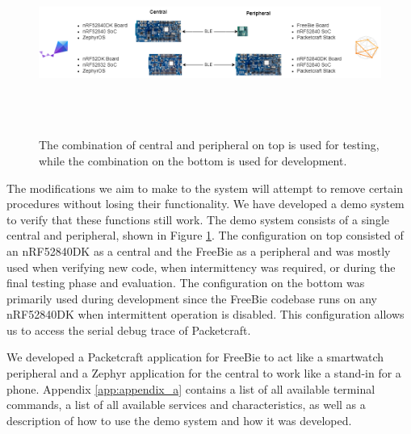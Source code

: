 \begin{figure}
    \centering
    \includegraphics[width=1\textwidth,height=6cm,keepaspectratio=true]{images/demo_layout/demo_layout.drawio.png}
    \caption{
        The combination of central and peripheral on top is used for testing, while the combination on the bottom is used for development.
    }
    \label{fig:demo_layout}
\end{figure}
The modifications we aim to make to the system will attempt to remove certain procedures without losing their functionality. We have developed a demo system to verify that these functions still work. The demo system consists of a single central and peripheral, shown in Figure \ref{fig:demo_layout}. The configuration on top consisted of an nRF52840DK as a central and the FreeBie as a peripheral and was mostly used when verifying new code, when intermittency was required, or during the final testing phase and evaluation. The configuration on the bottom was primarily used during development since the FreeBie codebase runs on any nRF52840DK when intermittent operation is disabled. This configuration allows us to access the serial debug trace of Packetcraft. 

We developed a Packetcraft application for FreeBie to act like a smartwatch peripheral and a Zephyr application for the central to work like a stand-in for a phone. Appendix \ref{app:appendix_a} contains a list of all available terminal commands, a list of all available services and characteristics, as well as a description of how to use the demo system and how it was developed. 